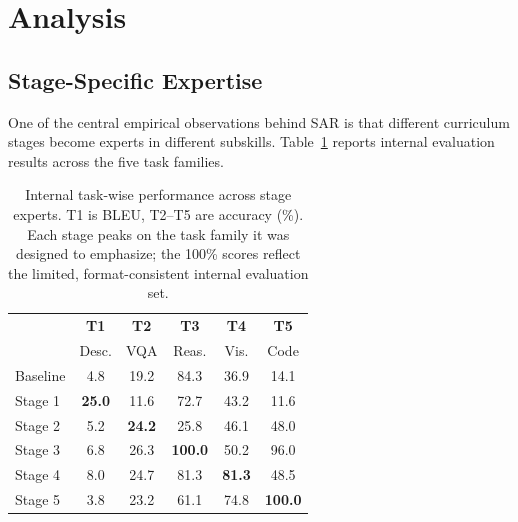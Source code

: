 \documentclass[journal]{IEEEtran}
\newcommand{\method}{2D-CL}
\newcommand{\sar}{SAR}
\begin{document}
\begin{table}[!t]
\centering
\footnotesize
{}
\vspace{4pt}
\caption{Representative shared failures where both the best fixed expert and \method{}+\sar{} are incorrect.}
\label{tab:error_examples}
\end{table}

\section{Analysis}
\subsection{Stage-Specific Expertise}
One of the central empirical observations behind \sar{} is that different curriculum stages become experts in different subskills.
Table~\ref{tab:stage_performance} reports internal evaluation results across the five task families.

\begin{table}[!t]
\centering
\small
\begin{tabular}{lccccc}
\toprule
& \textbf{T1} & \textbf{T2} & \textbf{T3} & \textbf{T4} & \textbf{T5} \\
& Desc. & VQA & Reas. & Vis. & Code \\
\midrule
Baseline & 4.8 & 19.2 & 84.3 & 36.9 & 14.1 \\
Stage 1 & \textbf{25.0} & 11.6 & 72.7 & 43.2 & 11.6 \\
Stage 2 & 5.2 & \textbf{24.2} & 25.8 & 46.1 & 48.0 \\
Stage 3 & 6.8 & 26.3 & \textbf{100.0} & 50.2 & 96.0 \\
Stage 4 & 8.0 & 24.7 & 81.3 & \textbf{81.3} & 48.5 \\
Stage 5 & 3.8 & 23.2 & 61.1 & 74.8 & \textbf{100.0} \\
\bottomrule
\end{tabular}
\vspace{4pt}
\caption{Internal task-wise performance across stage experts. T1 is BLEU, T2--T5 are accuracy (\%). Each stage peaks on the task family it was designed to emphasize; the 100\% scores reflect the limited, format-consistent internal evaluation set.}
\label{tab:stage_performance}
\end{table}
\end{document}
